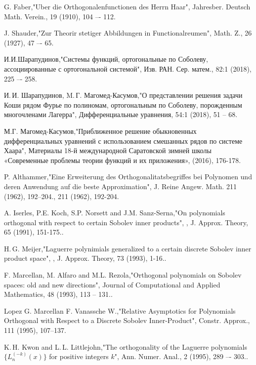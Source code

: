\begin{thebibliography}{20}


G. Faber,"Uber die Orthogonalenfunctionen des Herrn Haar", Jahresber. Deutsch Math. Verein., 19 (1910), 104 –- 112.

J. Shauder,"Zur Theorir stetiger Abbildungen in Functionalreumen", Math. Z., 26 (1927), 47 –- 65.

И.И.Шарапудинов,"Системы функций, ортогональные по Соболеву, ассоциированные с ортогональной системой", Изв. РАН. Сер. матем., 82:1 (2018), 225 –- 258.

И.\,И. Шарапудинов, M.\,Г. Магомед-Касумов,"О представлении решения задачи Коши  рядом Фурье  по полиномам, ортогональным по  Соболеву, порожденным многочленами Лагерра", Дифференциальные уравнения, 54:1 (2018), 51 -- 68.

М.Г. Магомед-Касумов,"Приближенное решение обыкновенных дифференциальных уравнений с использованием смешанных рядов по системе Хаара", Материалы 18-й международной Саратовской зимней школы «Современные проблемы теории функций и их приложения»,  (2016), 176-178.

P. Althammer,"Eine Erweiterung des Orthogonalitatsbegriffes bei Polynomen und deren Anwendung  auf die beste Approximation", J. Reine Angew. Math. 211 (1962), 192–204., 211 (1962), 192-204.

A. Iserles, P.E. Koch, S.P. Norsett and J.M. Sanz-Serna,"On polynomials  orthogonal  with respect  to certain Sobolev inner products", ,  J. Approx. Theory, 65 (1991), 151-175..

H.\,G. Meijer,"Laguerre polynimials generalized to a certain discrete Sobolev inner product space", ,  J. Approx. Theory, 73 (1993), 1-16..

F. Marcellan, M. Alfaro and M.L. Rezola,"Orthogonal polynomials on Sobolev spaces: old and new directions", Journal of Computational and Applied Mathematics, 48 (1993), 113 -- 131..

Lopez G. Marcellan F. Vanassche W.,"Relative Asymptotics for Polynomials Orthogonal with Respect to a Discrete Sobolev Inner-Product", Constr. Approx., 111 (1995), 107–137.

K.\,H. Kwon and L.\,L. Littlejohn,"The orthogonality of the Laguerre polynomials $\{L_n^{(-k)}(x)\}$ for positive integers $k$", Ann. Numer. Anal., 2 (1995), 289 –- 303..


\end{thebibliography}
